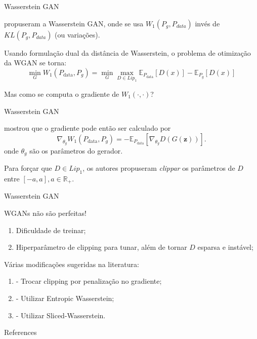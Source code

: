 \documentclass[10pt]{beamer}
\begin{document}
\begin{frame}[fragile]{Wasserstein GAN}

	\citet{arjovsky2017wasserstein} propuseram a Wasserstein GAN,
	onde se usa $W_1(P_g, P_{data})$ invés de $KL(P_g, P_{data})$ (ou variações).

	\vspace{3mm}
	Usando formulação dual da distância de Wasserstein, o problema de otimização
	da WGAN se torna:
	\begin{displaymath}
		\min_{G} W_1(P_{\text{data}},P_g) = \min_{G}
		\max_{D \in Lip_1}\mathbb E_{P_{\text{data}}}[D(x)]
		-\mathbb E_{P_{g}}[D(x)]
		\label{eq:wgan}
	\end{displaymath}

	\vspace{3mm}
	Mas como se computa o gradiente de $W_1(\cdot, \cdot)$?

\end{frame}

\begin{frame}[fragile]{Wasserstein GAN}

	\citet{arjovsky2017wasserstein} mostrou que o gradiente pode então ser calculado
	por
	\begin{displaymath}
		\nabla_{\theta_g} W_1(P_{\text{data}},P_g) = - \mathbb E_{P_{\text{data}}}[\nabla_{\theta_g} D(G(\mathbf z))].
	\end{displaymath}
	onde $\theta_g$ são os parâmetros do gerador.

	Para forçar que $D \in Lip_1$,
	os autores propuseram \textit{clippar} os parâmetros de $D$
	entre $[-a,a], a \in \mathbb R_+$.

\end{frame}

\begin{frame}[fragile]{Wasserstein GAN}

	WGANs não são perfeitas!
	\begin{enumerate}
		\item Dificuldade de treinar;
		\item Hiperparâmetro de clipping para tunar, além de tornar $D$ esparsa e instável;
	\end{enumerate}

	Várias modificações sugeridas na literatura:
	\begin{enumerate}
		\item \citet{gulrajani2017improved} - Trocar clipping por penalização no gradiente;
		\item \citet{genevay2018learning} - Utilizar Entropic Wasserstein;
		\item \citet{deshpande2018generative} - Utilizar Sliced-Wasserstein.
	\end{enumerate}

\end{frame}

\begin{frame}[allowframebreaks]{References}
	\nocite{*}

	\renewcommand{\section}[2]{}%
	\tiny{}
	
\end{frame}
\end{document}
